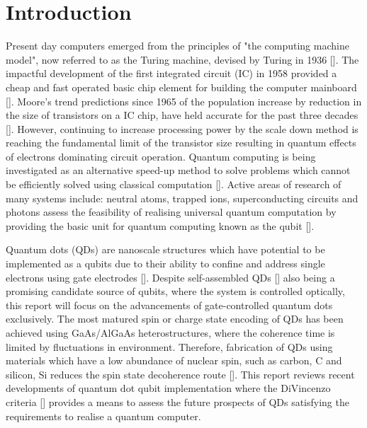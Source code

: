\section{\label{sec:level1}Introduction}
Present day computers emerged from the principles of "the computing machine model", now referred to as the Turing machine, devised by Turing in 1936 []. The impactful development of the first integrated circuit (IC) in 1958 provided a cheap and fast operated basic chip element for building the computer mainboard []. Moore's trend predictions since 1965 of the population increase by reduction in the size of transistors on a IC chip, have held accurate for the past three decades []. However, continuing to increase processing power by the scale down method is reaching the fundamental limit of the transistor size resulting in quantum effects of electrons dominating circuit operation. Quantum computing is being investigated as an alternative speed-up method to solve problems which cannot be efficiently solved using classical computation []. Active areas of research of many systems include: neutral atoms, trapped ions, superconducting circuits and photons assess the feasibility of realising universal quantum computation by providing the basic unit for quantum computing known as the qubit [].  


Quantum dots (QDs) are nanoscale structures which have potential to be implemented as a qubits due to their ability to confine and address single electrons using gate electrodes []. Despite self-assembled QDs [] also being a promising candidate source of qubits, where the system is controlled optically, this report will focus on the advancements of gate-controlled quantum dots exclusively. The most matured spin or charge state encoding of QDs has been achieved using GaAs/AlGaAs heterostructures, where the coherence time is limited by fluctuations in environment. Therefore, fabrication of QDs using materials which have a low abundance of nuclear spin, such as carbon, C and silicon, Si reduces the spin state decoherence route []. This report reviews recent developments of quantum dot qubit implementation where the DiVincenzo criteria [] provides a means to assess the future prospects of QDs satisfying the requirements to realise a quantum computer.


